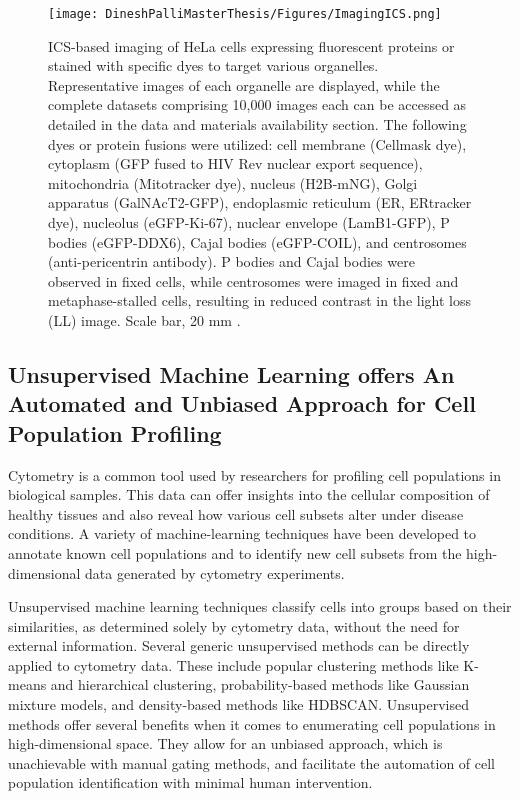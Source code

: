 \documentclass[12pt,a4paper]{article}
\begin{document}
\begin{figure}
  \centering
  \texttt{[image: DineshPalliMasterThesis/Figures/ImagingICS.png]}
  \caption{ICS-based imaging of HeLa cells expressing fluorescent proteins or stained with specific dyes to target various organelles. Representative images of each organelle are displayed, while the complete datasets comprising 10,000 images each can be accessed as detailed in the data and materials availability section. The following dyes or protein fusions were utilized: cell membrane (Cellmask dye), cytoplasm (GFP fused to HIV Rev nuclear export sequence), mitochondria (Mitotracker dye), nucleus (H2B-mNG), Golgi apparatus (GalNAcT2-GFP), endoplasmic reticulum (ER, ERtracker dye), nucleolus (eGFP-Ki-67), nuclear envelope (LamB1-GFP), P bodies (eGFP-DDX6), Cajal bodies (eGFP-COIL), and centrosomes (anti-pericentrin antibody). P bodies and Cajal bodies were observed in fixed cells, while centrosomes were imaged in fixed and metaphase-stalled cells, resulting in reduced contrast in the light loss (LL) image. Scale bar, 20 mm \cite{doi:10.1126/science.abj3013}.}
  \label{icsimaging}
\end{figure}

\subsection{Unsupervised Machine Learning offers An Automated and Unbiased Approach for Cell Population Profiling}

Cytometry is a common tool used by researchers for profiling cell populations in biological samples. This data can offer insights into the cellular composition of healthy tissues and also reveal how various cell subsets alter under disease conditions. A variety of machine-learning techniques have been developed to annotate known cell populations and to identify new cell subsets from the high-dimensional data generated by cytometry experiments.

Unsupervised machine learning techniques classify cells into groups based on their similarities, as determined solely by cytometry data, without the need for external information. Several generic unsupervised methods can be directly applied to cytometry data. These include popular clustering methods like K-means and hierarchical clustering, probability-based methods like Gaussian mixture models, and density-based methods like HDBSCAN. Unsupervised methods offer several benefits when it comes to enumerating cell populations in high-dimensional space. They allow for an unbiased approach, which is unachievable with manual gating methods, and facilitate the automation of cell population identification with minimal human intervention.
\end{document}
